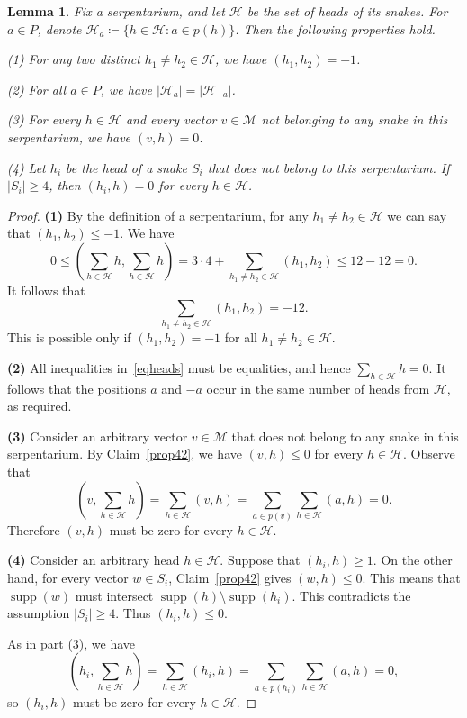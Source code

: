 \documentclass[12pt,a4paper]{article}
\newcommand{\M}{\mathcal{M}}
\DeclareMathOperator{\supp}{supp}
\newtheorem{lemma}[theorem]{Lemma}
\begin{document}
\begin{lemma}\label{lemserp}
    Fix a serpentarium, and let $\mathcal H$ be the set of heads of its snakes. For $a \in P$, denote $\mathcal H_a \coloneqq \{h \in \mathcal H: a \in p(h)\}$. Then the following properties hold.

    (1) For any two distinct $h_1 \not= h_2 \in \mathcal H$, we have $(h_1,h_2)=-1$.

    (2) For all $a \in P$, we have $|\mathcal H_a|=|\mathcal H_{-a}|$.

    (3) For every $h \in \mathcal H$ and every vector $v \in \M$ not belonging to any snake in this serpentarium, we have $(v,h)=0$.

    (4) Let $h_i$ be the head of a snake $S_i$ that does not belong to this serpentarium. If $|S_i|\geqslant 4$, then $(h_i,h)=0$ for every $h\in\mathcal H$.
\end{lemma}

\begin{proof}
    {\bf (1)} By the definition of a serpentarium, for any $h_1 \not= h_2 \in \mathcal H$ we can say that $(h_1,h_2)\leqslant -1$. We have
    \begin{equation}\label{eqheads}
        0 \leqslant \left(\sum_{h \in \mathcal H} h, \sum_{h \in \mathcal H} h\right) = 3\cdot4 + \sum_{h_1 \not=h_2 \in \mathcal H} (h_1,h_2) \leqslant 12-12=0.
    \end{equation}
    It follows that
    $$\sum_{h_1 \not=h_2 \in \mathcal H} (h_1,h_2)=-12.$$
    This is possible only if $(h_1,h_2)=-1$ for all $h_1 \not= h_2\in\mathcal H$.

    {\bf (2)} All inequalities in~\eqref{eqheads} must be equalities, and hence $\sum_{h\in\mathcal H} h=0$. It follows that the positions $a$ and $-a$ occur in the same number of heads from $\mathcal H$, as required.

    {\bf (3)} Consider an arbitrary vector $v\in\mathcal M$ that does not belong to any snake in this serpentarium. By Claim~\ref{prop42}, we have $(v,h)\leqslant 0$ for every $h\in\mathcal H$. Observe that
    $$
    \left(v,\sum_{h \in \mathcal H} h \right) = \sum_{h \in \mathcal H} (v,h) = \sum_{a \in p(v)} \sum_{h \in \mathcal H}  (a,h) = 0.
    $$
    Therefore $(v,h)$ must be zero for every $h\in\mathcal H$.

    {\bf (4)} Consider an arbitrary head $h\in\mathcal H$. Suppose that $(h_i,h)\geqslant 1$. On the other hand, for every vector $w\in S_i$, Claim~\ref{prop42} gives $(w,h)\leqslant 0$. This means that $\supp(w)$ must intersect $\supp(h)\setminus\supp(h_i)$. This contradicts the assumption $|S_i|\geqslant 4$. Thus $(h_i,h)\leqslant 0$.

    As in part (3), we have
    $$
    \left(h_i,\sum_{h \in \mathcal H} h \right) = \sum_{h \in \mathcal H} (h_i,h) = \sum_{a \in p(h_i)} \sum_{h \in \mathcal H}  (a,h) = 0,
    $$
    so $(h_i,h)$ must be zero for every $h\in\mathcal H$.
\end{proof}
\end{document}
